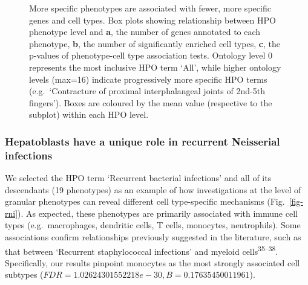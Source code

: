 \documentclass[
]{article}
\begin{document}
\label{cell-fig-ontology-lvl}
\begin{figure}[H]


\caption{\label{fig-ontology-lvl}More specific phenotypes are associated
with fewer, more specific genes and cell types. Box plots showing
relationship between HPO phenotype level and \textbf{a}, the number of
genes annotated to each phenotype, \textbf{b}, the number of
significantly enriched cell types, \textbf{c}, the p-values of
phenotype-cell type association tests. Ontology level 0 represents the
most inclusive HPO term `All', while higher ontology levels (max=16)
indicate progressively more specific HPO terms (e.g.~`Contracture of
proximal interphalangeal joints of 2nd-5th fingers'). Boxes are coloured
by the mean value (respective to the subplot) within each HPO level.}

\end{figure}%

\subsubsection{Hepatoblasts have a unique role in recurrent Neisserial
infections}\label{hepatoblasts-have-a-unique-role-in-recurrent-neisserial-infections}

We selected the HPO term `Recurrent bacterial infections' and all of its
descendants (19 phenotypes) as an example of how investigations at the
level of granular phenotypes can reveal different cell type-specific
mechanisms (Fig.~\ref{fig-rni}). As expected, these phenotypes are
primarily associated with immune cell types (e.g.~macrophages, dendritic
cells, T cells, monocytes, neutrophils). Some associations confirm
relationships previously suggested in the literature, such as that
between `Recurrent staphylococcal infections' and myeloid
cells\textsuperscript{35--38}. Specifically, our results pinpoint
monocytes as the most strongly associated cell subtypes
(\(FDR=1.02624301552218e-30,B=0.17635450011961\)).
\end{document}
